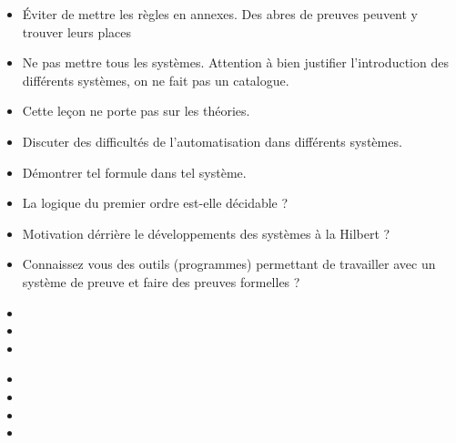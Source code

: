 \documentclass{agregfiche}
\begin{document}
\secpieges

\begin{itemize}
	\item Éviter de mettre les règles en annexes. Des abres de preuves peuvent y trouver leurs places
	\item Ne pas mettre tous les systèmes. Attention à bien justifier l'introduction des différents systèmes, on ne fait pas un catalogue.
	\item Cette leçon ne porte pas sur les théories.
\end{itemize}

\secquestionsclassiques

\begin{itemize}
	\item Discuter des difficultés de l'automatisation dans différents systèmes.
	\item Démontrer tel formule dans tel système.
	\item La logique du premier ordre est-elle décidable ?
	\item Motivation dérrière le développements des systèmes à la Hilbert ?
	\item Connaissez vous des outils (programmes) permettant de travailler avec un système de preuve et faire des preuves formelles ?
\end{itemize}

\secreferences

\begin{itemize}
\item 
\item {}
\item {}
\end{itemize}

\secdev

\begin{itemize}
\item {}
\item {}
\item {}
\item {}
\end{itemize}
\end{document}
